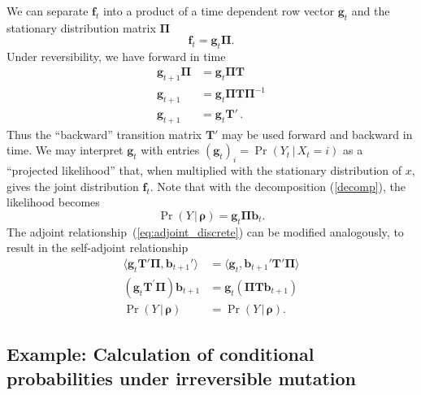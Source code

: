 \documentclass[preprint]{elsarticle}
\newcommand{\bs}[1]{\ensuremath{\boldsymbol{#1}}}
\newcommand\given{{\,|\,}}
\newcommand\x[1]{\ensuremath{X_{#1}}}
\newcommand\y{\ensuremath{Y}}
\newcommand\fv[1]{\ensuremath{\mathbf{f}_{#1}}}
\newcommand\bv[1]{\ensuremath{\mathbf{b}_{#1}}}
\newcommand\gv[1]{\ensuremath{\mathbf{g}_{#1}}}
\begin{document}
We can separate $\fv{t}$ into a product of a time dependent row vector $\gv{t}$ and the stationary distribution matrix $\mathbf{\Pi}$
\begin{equation}\label{decomp}
\fv{t}=\gv{t}\mathbf{\Pi}.
\end{equation}
    Under reversibility, we have forward in time
\begin{equation}
\begin{split}
\gv{t+1}\mathbf{\Pi} &=\gv{t}\mathbf{\Pi}\mathbf{T}\\
\gv{t+1}             &=\gv{t}\mathbf{\Pi}\mathbf{T}\mathbf{\Pi}^{-1}\\
\gv{t+1}             &=\gv{t}\mathbf{T}'\,.
\end{split}
\end{equation}
Thus the ``backward'' transition matrix $\mathbf{T}'$ may be used forward and backward in time. We may interpret $\gv{t}$ with entries $(\gv{t})_i=\Pr(\y_{t}\given \x{t}=i)$ as a ``projected likelihood'' that, when multiplied with the stationary distribution of $x$, gives the joint distribution $\fv{t}$. Note that with the decomposition (\ref{decomp}), the likelihood becomes
\begin{equation}
\Pr(\y \given \bs{\rho}) = \gv{t} \mathbf{\Pi} \bv{t}.
\end{equation}
The adjoint relationship~(\ref{eq:adjoint_discrete}) can be modified analogously, to result in the self-adjoint relationship
\begin{equation}\label{eq:adjoint_discrete_2}
\begin{split}
\langle \gv{t}\mathbf{T}'\mathbf{\Pi},\bv{t+1}'\rangle &= \langle \gv{t},\bv{t+1}'\mathbf{T}'\mathbf{\Pi} \rangle \\
\left(\gv{t}\mathbf{T}^{'}\mathbf{\Pi}\right)\bv{t+1} &= \gv{t}\left(\mathbf{\Pi} \mathbf{T} \bv{t+1}\right) \\
\Pr(\y \given \bs{\rho})                              &= \Pr(\y \given \bs{\rho}).
\end{split}
\end{equation}

\subsection{Example: Calculation of conditional probabilities under irreversible mutation}\label{section:irreversible}
\end{document}
